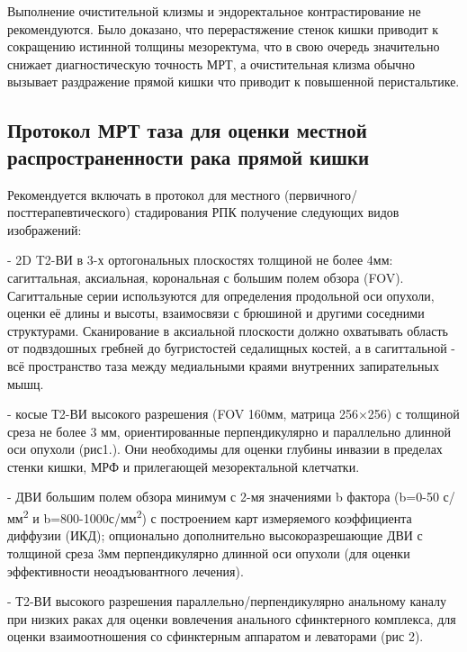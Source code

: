 \documentclass[
  russian,
  12pt,
  a4paper,
]{report}
\begin{document}
Выполнение очистительной клизмы и эндоректальное контрастирование не
рекомендуются. Было доказано, что перерастяжение стенок кишки приводит к
сокращению истинной толщины мезоректума, что в свою очередь значительно
снижает диагностическую точность МРТ, а очистительная клизма обычно
вызывает раздражение прямой кишки что приводит к повышенной
перистальтике.

\subsection{Протокол МРТ таза для оценки местной распространенности рака
прямой
кишки}\label{ux43fux440ux43eux442ux43eux43aux43eux43b-ux43cux440ux442-ux442ux430ux437ux430-ux434ux43bux44f-ux43eux446ux435ux43dux43aux438-ux43cux435ux441ux442ux43dux43eux439-ux440ux430ux441ux43fux440ux43eux441ux442ux440ux430ux43dux435ux43dux43dux43eux441ux442ux438-ux440ux430ux43aux430-ux43fux440ux44fux43cux43eux439-ux43aux438ux448ux43aux438}

Рекомендуется включать в протокол для местного
(первичного/посттерапевтического) стадирования РПК получение следующих
видов изображений:

- 2D T2-ВИ в 3-х ортогональных плоскостях толщиной не более 4мм:
сагиттальная, аксиальная, корональная с большим полем обзора (FOV).
Сагиттальные серии используются для определения продольной оси опухоли,
оценки её длины и высоты, взаимосвязи с брюшиной и другими соседними
структурами. Сканирование в аксиальной плоскости должно охватывать
область от подвздошных гребней до бугристостей седалищных костей, а в
сагиттальной - всё пространство таза между медиальными краями внутренних
запирательных мышц.

- косые Т2-ВИ высокого разрешения (FOV 160мм, матрица 256×256) с
толщиной среза не более 3 мм, ориентированные перпендикулярно и
параллельно длинной оси опухоли (рис1.). Они необходимы для оценки
глубины инвазии в пределах стенки кишки, МРФ и прилегающей
мезоректальной клетчатки.

- ДВИ большим полем обзора минимум с 2-мя значениями b фактора (b=0-50
с/мм\textsuperscript{2} и b=800-1000с/мм\textsuperscript{2}) с
построением карт измеряемого коэффициента диффузии (ИКД); опционально
дополнительно высокоразрешающие ДВИ с толщиной среза 3мм перпендикулярно
длинной оси опухоли (для оценки эффективности неоадъювантного лечения).

- Т2-ВИ высокого разрешения параллельно/перпендикулярно анальному каналу
при низких раках для оценки вовлечения анального сфинктерного комплекса,
для оценки взаимоотношения со сфинктерным аппаратом и леваторами (рис
2).
\end{document}
